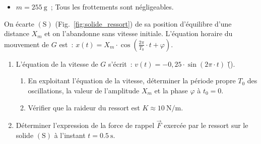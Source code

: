 \begin{donnees}
    \begin{itemize}
        \item $m=\qty{255}{\gram}$~;
              Tous les frottements sont négligeables.
    \end{itemize}
\end{donnees}
On écarte $\mathrm{(S)}$ (Fig.~\ref{fig:solide_ressort}) de sa position
d'équilibre d'une distance $X_m$ et on l'abandonne sans vitesse initiale.
L'équation horaire du mouvement de $G$ est~:
${x(t)=X_m \cdot \cos\left(\frac{2\pi}{T_0} \cdot t+\varphi\right)}$.
\begin{enumerate}
    \item L'équation de la vitesse de $G$ s'écrit~:
          $v(t)=-0,25 \cdot \sin(2\pi\cdot t)$ \; (\unit{\v}).
          \begin{enumerate}
              \item En exploitant l'équation de la vitesse, déterminer la
                    période propre $T_0$ des oscillations, la valeur de
                    l'amplitude $X_m$ et la phase $\varphi$ à $t_0=0$.
              \item Vérifier que la raideur du ressort est
                    $K\approx\qty{10}{\newton\per\meter}$.
          \end{enumerate}
    \item Déterminer l'expression de la force de rappel $\vec{F}$ exercée par le
          ressort sur le solide $\mathrm{(S)}$ à l'instant
          $t=\qty{0,5}{\second}$.
\end{enumerate}

